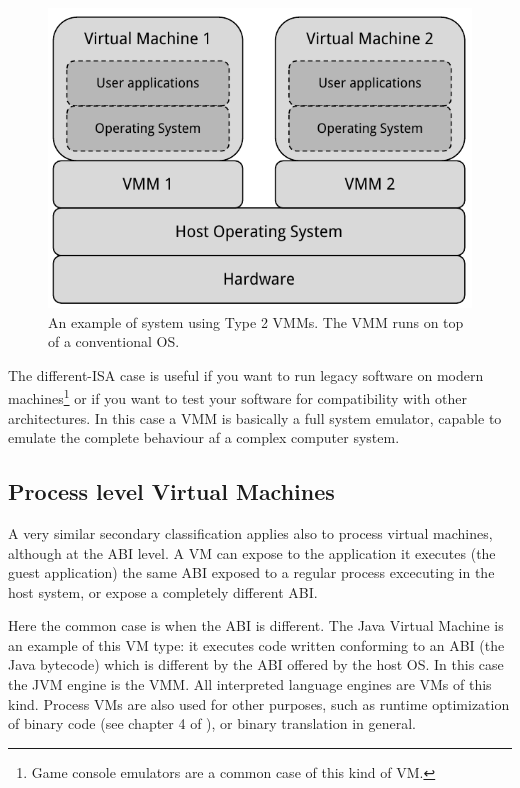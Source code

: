 \begin{figure}[bt]
\centering
\includegraphics[scale = 1.0]{type-2-vmm.pdf}
\caption{An example of system using Type 2 VMMs. The VMM runs on top of a conventional OS.}
\label{fig:t2vmm}
\end{figure}



\vspace{0.5cm}

The different-ISA case is useful if you want to run legacy software on modern machines\footnote{Game console emulators are a common case 
of this kind of VM.} or if you want to test your software for compatibility with other architectures. In this case a VMM is basically a
full system emulator, capable to emulate the complete behaviour af a complex computer system.


\subsection{Process level Virtual Machines}
A very similar secondary classification applies also to process virtual machines, although at the ABI level. A VM can expose to the
application it executes (the guest application) the same ABI exposed to a regular process excecuting in the host system, or expose a 
completely different ABI.

Here the common case is when the ABI is different. The Java Virtual Machine is an example of this VM type: it executes code written 
conforming to an ABI (the Java bytecode) which is different by the ABI offered by the host OS. In this case the JVM engine is the VMM.
All interpreted language engines are VMs of this kind. Process VMs are also used for other purposes, such as runtime optimization
of binary code (see chapter 4 of \cite{ref:vmbook}), or binary translation in general.

